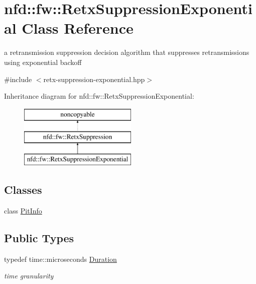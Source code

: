 \hypertarget{classnfd_1_1fw_1_1RetxSuppressionExponential}{}\section{nfd\+:\+:fw\+:\+:Retx\+Suppression\+Exponential Class Reference}
\label{classnfd_1_1fw_1_1RetxSuppressionExponential}


a retransmission suppression decision algorithm that suppresses retransmissions using exponential backoff  




{\ttfamily \#include $<$retx-\/suppression-\/exponential.\+hpp$>$}

Inheritance diagram for nfd\+:\+:fw\+:\+:Retx\+Suppression\+Exponential\+:\begin{figure}[H]
\begin{center}
\leavevmode
\includegraphics[height=3.000000cm]{classnfd_1_1fw_1_1RetxSuppressionExponential}
\end{center}
\end{figure}
\subsection*{Classes}
\begin{DoxyCompactItemize}
\item 
class \hyperlink{classnfd_1_1fw_1_1RetxSuppressionExponential_1_1PitInfo}{Pit\+Info}
\end{DoxyCompactItemize}
\subsection*{Public Types}
\begin{DoxyCompactItemize}
\item 
typedef time\+::microseconds \hyperlink{classnfd_1_1fw_1_1RetxSuppressionExponential_a8bf25d84d9b6756133a9c0822e0a4f7b}{Duration}\hypertarget{classnfd_1_1fw_1_1RetxSuppressionExponential_a8bf25d84d9b6756133a9c0822e0a4f7b}{}\label{classnfd_1_1fw_1_1RetxSuppressionExponential_a8bf25d84d9b6756133a9c0822e0a4f7b}

\begin{DoxyCompactList}\small\item\em time granularity \end{DoxyCompactList}\end{DoxyCompactItemize}
